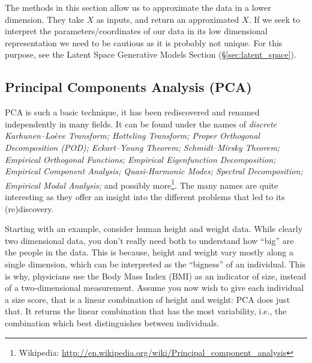 \begin{remark}
 The methods in this section allow us to approximate the data in a lower dimension. 
 They take $X$ as inputs, and return an approximated $X$. 
 If we seek to interpret the parameters/coordinates of our data in its low dimensional representation we need to be cautious as it is probably not unique. For this purpose, see the Latent Space Generative Models Section (\S\ref{sec:latent_space}).
\end{remark}




\subsection{Principal Components Analysis (PCA)}
\label{sec:pca}

PCA is such a basic technique, it has been rediscovered and renamed independently in many fields. 
It can be found under the names of \emph{discrete Karhunen–Loève Transform; Hotteling Transform; Proper Orthogonal Decomposition (POD); Eckart–Young Theorem; Schmidt–Mirsky Theorem;  Empirical Orthogonal Functions; Empirical Eigenfunction Decomposition;  Empirical Component Analysis;  Quasi-Harmonic Modes;  Spectral Decomposition;  Empirical Modal Analysis;} and possibly more\footnote{Wikipedia: \url{http://en.wikipedia.org/wiki/Principal_component_analysis} }.
The many names are quite interesting as they offer an insight into the different problems that led to its (re)discovery.

Starting with an example, consider human height and weight data. 
While clearly two dimensional data, you don't really need both to understand how ``big'' are the people in the data. 
This is because, height and weight vary mostly along a single dimension, which can be interpreted as the ``bigness'' of an individual. 
This is why, physicians use the Body Mass Index (BMI) as an indicator of size, instead of a two-dimensional measurement.
Assume you now wish to give each individual a size score, that is a linear combination of height and weight: PCA does just that. It returns the linear combination that has the most variability, i.e., the combination which best distinguishes between individuals. 



